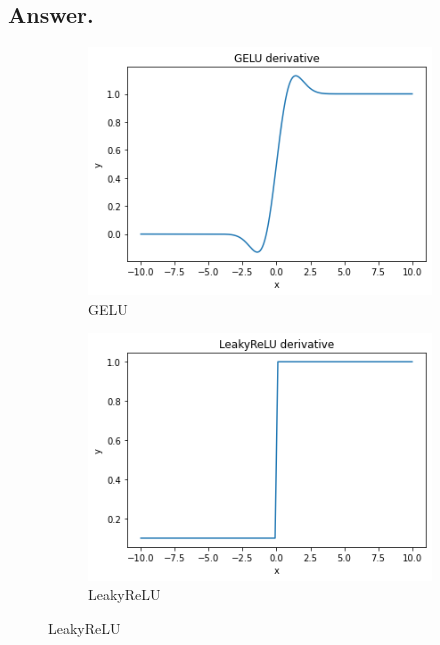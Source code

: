 \documentclass{article}
\begin{document}
\begin{itemize}
    \subsection*{Answer.}
    \begin{figure}[H]
        \centering
        \begin{subfigure}[b]{0.45\textwidth} %
          \includegraphics[width=\textwidth]{GELU.png}
          \caption{GELU}
          \label{fig:GELU}
        \end{subfigure}
        \hfill %
        \begin{subfigure}[b]{0.45\textwidth} %
          \includegraphics[width=\textwidth]{lrelu.png}
          \caption{LeakyReLU}

\end{subfigure}
\end{figure}
\end{itemize}
\end{document}
